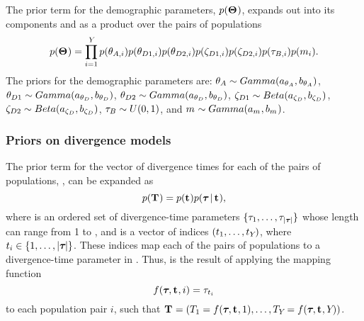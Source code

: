\begin{linenomath}
The prior term for the demographic parameters, $p(\mathbf{\Theta_{}})$,
expands out into its components and as a product over the \npairs{}
pairs of populations
\begin{equation}
    p(\demographicParamVector) =
    \prod_{i=1}^{\npairs{}}
    p(\ancestralTheta{i})
    p(\descendantTheta{1}{i})
    p(\descendantTheta{2}{i})
    p(\bottleScalar{1}{i})
    p(\bottleScalar{2}{i})
    p(\bottleTime{i})
    p(\migrationRate{i}).
    \label{eq:demographicPrior}
\end{equation}
The priors for the demographic parameters are:
$\ancestralTheta{} \sim Gamma(\gammaShape{\ancestralTheta{}},
\gammaScale{\ancestralTheta{}})$,
$\descendantTheta{1}{} \sim Gamma(\gammaShape{\descendantTheta{}{}},
\gammaScale{\descendantTheta{}{}})$,
$\descendantTheta{2}{} \sim Gamma(\gammaShape{\descendantTheta{}{}},
\gammaScale{\descendantTheta{}{}})$,
$\bottleScalar{1}{} \sim Beta(\betaA{\bottleScalar{}{}},
\betaB{\bottleScalar{}{}})$,
$\bottleScalar{2}{} \sim Beta(\betaA{\bottleScalar{}{}},
\betaB{\bottleScalar{}{}})$,
$\bottleTime{} \sim U(0, 1)$,
and
$m_{} \sim Gamma(a_{m_{}},
b_{m_{}})$.
\end{linenomath}

\subsubsection{Priors on divergence models}
\begin{linenomath}
The prior term for the vector of divergence times for each of the \npairs{}
pairs of populations, \divTimeMapVector, can be expanded as
\begin{equation}
    p(\mathbf{T_{}}) = p(\mathbf{t_{}})p(\boldsymbol{\tau_{}} \,|\, \mathbf{t_{}}),
    \label{eq:divModelPrior}
\end{equation}
where \divTimeVector is an ordered set of divergence-time parameters
$\{\tau_{1}, \ldots, \tau_{\lvert \boldsymbol{\tau_{}} \rvert}\}$ whose length
\divTimeNum can range from 1 to \npairs{},
and \divTimeIndexVector is a vector of indices %
$(t_{1}, \ldots, t_{Y_{}})$,
where
$t_{i} \in \{1, \ldots, \lvert \boldsymbol{\tau_{}} \rvert\}$.
These indices map each of the \npairs{} pairs of populations to a
divergence-time parameter in \divTimeVector.
Thus, \divTimeMapVector is the result of applying the mapping function
\begin{equation}
    f(\boldsymbol{\tau_{}}, \mathbf{t_{}}, i) = \tau_{t_{i}}
    \label{eq:divTimeMapFunction}
\end{equation}
to each population pair $i$, such that
$\mathbf{T_{}} = (T_{1} = f(\boldsymbol{\tau_{}}, \mathbf{t_{}},
1), \ldots, T_{Y_{}} = f(\boldsymbol{\tau_{}}, \mathbf{t_{}},
Y_{}))$.
\end{linenomath}

